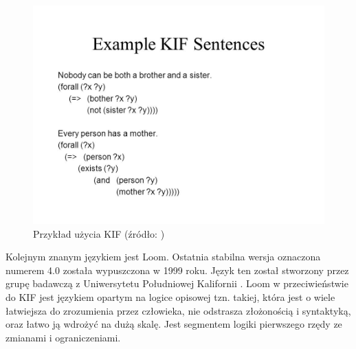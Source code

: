\documentclass[a4paper,12pt, twoside]{book} %
\begin{document}
\begin{figure}[h]
	\centering
	\includegraphics[scale=0.35]{slide_9.jpg}
	\caption{Przykład użycia KIF (źródło: \cite{KIF})}
\end{figure}

Kolejnym znanym językiem jest Loom. Ostatnia stabilna wersja oznaczona numerem 4.0 została wypuszczona w 1999 roku. Język ten został stworzony przez grupę badawczą z Uniwersytetu Południowej Kalifornii \cite{wikipedloom}. Loom w przeciwieństwie do KIF jest językiem opartym na logice opisowej tzn. takiej, która jest o wiele łatwiejsza do zrozumienia przez człowieka, nie odstrasza złożonością i syntaktyką, oraz łatwo ją wdrożyć na dużą skalę. Jest segmentem logiki pierwszego rzędy ze zmianami i ograniczeniami. 
\end{document}
